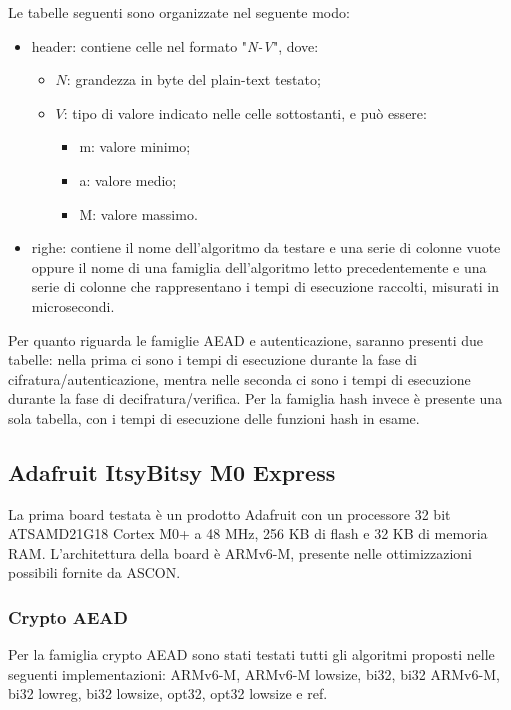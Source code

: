 \documentclass[12pt,a4paper,italian]{report}
\begin{document}
\noindent Le tabelle seguenti sono organizzate nel seguente modo:
\begin{itemize}
    \item header: contiene celle nel formato "\textit{N-V}", dove:
    \begin{itemize}
        \item $N$: grandezza in byte del plain-text testato;
        \item $V$: tipo di valore indicato nelle celle sottostanti, e può essere:
        \begin{itemize}
            \item m: valore minimo;
            \item a: valore medio;
            \item M: valore massimo.
        \end{itemize}
    \end{itemize}
    \item righe: contiene il nome dell'algoritmo da testare e una serie di colonne vuote oppure il nome di una famiglia dell'algoritmo letto precedentemente e una serie di colonne che rappresentano i tempi di esecuzione raccolti, misurati in microsecondi.
\end{itemize}

\noindent Per quanto riguarda le famiglie AEAD e autenticazione, saranno presenti due tabelle: nella prima ci sono i tempi di esecuzione durante la fase di cifratura/autenticazione, mentra nelle seconda ci sono i tempi di esecuzione durante la fase di decifratura/verifica. Per la famiglia hash invece è presente una sola tabella, con i tempi di esecuzione delle funzioni hash in esame.

\subsection{Adafruit ItsyBitsy M0 Express}

La prima board testata è un prodotto Adafruit con un processore 32 bit ATSAMD21G18 Cortex M0+ a 48 MHz, 256 KB di flash e 32 KB di memoria RAM.\cite{adafruit} L'architettura della board è ARMv6-M, presente nelle ottimizzazioni possibili fornite da ASCON.\cite{arm}

\subsubsection{Crypto AEAD}

Per la famiglia crypto AEAD sono stati testati tutti gli algoritmi proposti nelle seguenti implementazioni: ARMv6-M, ARMv6-M lowsize, bi32, bi32 ARMv6-M, bi32 lowreg, bi32 lowsize, opt32, opt32 lowsize e ref.
\end{document}
